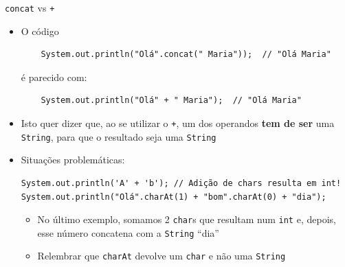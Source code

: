 \documentclass[portuguese, aspectratio=169, xcolor=table]{beamer}
\begin{document}
\begin{frame}[fragile]{\texttt{concat} vs \texttt{+}}
\begin{itemize}
    \item O código
    \begin{verbatim}
    System.out.println("Olá".concat(" Maria"));  // "Olá Maria"
    \end{verbatim}
é parecido com:

  \begin{verbatim}
    System.out.println("Olá" + " Maria");  // "Olá Maria"
\end{verbatim}

    \item Isto quer dizer que, ao se utilizar o \texttt{+}, um dos operandos \textbf{tem de ser} uma \texttt{String}, para que o resultado seja uma \texttt{String}
    \item Situações problemáticas:
\begin{verbatim}
System.out.println('A' + 'b'); // Adição de chars resulta em int!
System.out.println("Olá".charAt(1) + "bom".charAt(0) + "dia");
\end{verbatim}
\begin{itemize}
    \item No último exemplo, somamos 2 \texttt{char}s que resultam num \texttt{int} e, depois, esse número concatena com a \texttt{String} ``dia''
    \item Relembrar que \texttt{charAt} devolve um \texttt{char} e não uma \texttt{String}
\end{itemize}

\end{itemize}
\end{frame}
\end{document}
